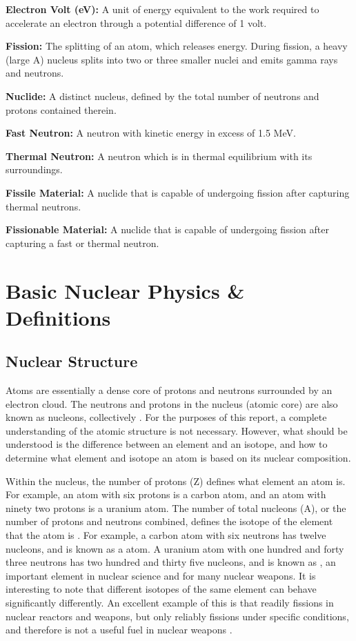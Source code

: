 \documentclass{report}
\begin{document}
\textbf{Electron Volt (eV):} A unit of energy equivalent to the work required to accelerate an electron through a potential difference of 1 volt. 

\textbf{Fission:} The splitting of an atom, which releases energy. During fission, a heavy (large A) nucleus splits into two or three smaller nuclei and emits gamma rays and neutrons. 

\textbf{Nuclide:} A distinct nucleus, defined by the total number of neutrons and protons contained therein.  

\textbf{Fast Neutron:} A neutron with kinetic energy in excess of 1.5 MeV.

\textbf{Thermal Neutron:} A neutron which is in thermal equilibrium with its surroundings. 

\textbf{Fissile Material:} A nuclide that is capable of undergoing fission after capturing thermal neutrons.

\textbf{Fissionable Material:} A nuclide that is capable of undergoing fission after capturing a fast or thermal neutron.



\chapter[Appendix B: Basic Nuclear Physics \& Definitions]{Basic Nuclear Physics \& Definitions}  \label{app:physics}



\section{Nuclear Structure}

Atoms are essentially a dense core of protons and neutrons surrounded by an electron cloud. The neutrons and protons in the nucleus (atomic core) are also known as nucleons, collectively \cite{krane1987introductory}. For the purposes of this report, a complete understanding of the atomic structure is not necessary. However, what should be understood is the difference between an element and an isotope, and how to determine what element and isotope an atom is based on its nuclear composition. 

Within the nucleus, the number of protons (Z) defines what element an atom is. For example, an atom with six protons is a carbon atom, and an atom with ninety two protons is a uranium atom. The number of total nucleons (A), or the number of protons and neutrons combined, defines the isotope of the element that the atom is \cite{krane1987introductory}. For example, a carbon atom with six neutrons has twelve nucleons, and is known as a  atom. A uranium atom with one hundred and forty three neutrons has two hundred and thirty five nucleons, and is known as , an important element in nuclear science and for many nuclear weapons. It is interesting to note that different isotopes of the same element can behave significantly differently. An excellent example of this is that  readily fissions in nuclear reactors and weapons, but  only reliably fissions under specific conditions, and therefore is not a useful fuel in nuclear weapons \cite{krane1987introductory,Duderstadt1976}. 
\end{document}
